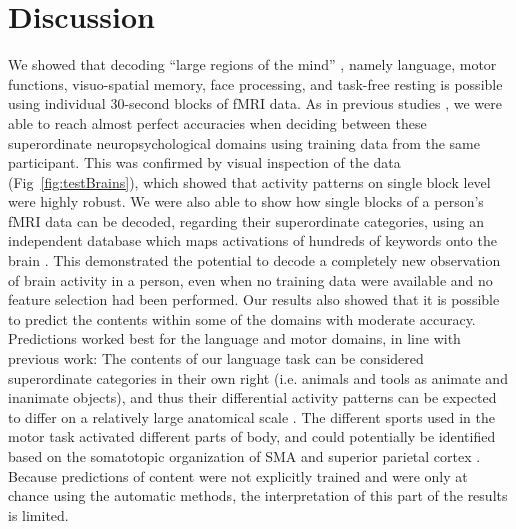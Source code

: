 \documentclass[fleqn,10pt]{SelfArx} %
\begin{document}
\section{Discussion}

We showed that decoding “large regions of the mind” \citep{Broca_1861}, namely language, motor functions, visuo-spatial memory, face processing, and task-free resting is possible using individual 30-second blocks of fMRI data. As in previous studies \citep{Boly_2007,  Sorger_2012}, we were able to reach almost perfect accuracies when deciding between these superordinate neuropsychological domains using training data from the same participant. This was confirmed by visual inspection of the data (Fig~\ref{fig:testBrains}), which showed that activity patterns on single block level were highly robust.
We were also able to show how single blocks of a person's fMRI data can be decoded, regarding their superordinate categories, using an independent database which maps activations of hundreds of keywords onto the brain \citep{Yarkoni_2011}. This demonstrated the potential to decode a completely new observation of brain activity in a person, even when no training data were available and no feature selection had been performed.
Our results also showed that it is possible to predict the contents within some of the domains with moderate accuracy. Predictions worked best for the language and motor domains, in line with previous work: The contents of our language task can be considered superordinate categories in their own right (i.e. animals and tools as animate and inanimate objects), and thus their differential activity patterns can be expected to differ on a relatively large anatomical scale \citep{Mummery_1998}. The different sports used in the motor task activated different parts of body, and could potentially be identified based on the somatotopic organization of SMA and superior parietal cortex \citep{Fontaine_2002, Aflalo_2015}. Because predictions of content were not explicitly trained and were only at chance using the automatic methods, the interpretation of this part of the results is limited.
\end{document}
